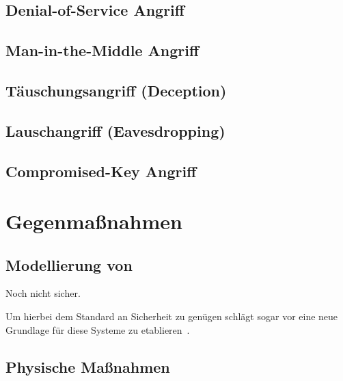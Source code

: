 \documentclass[final,bibliography=totocnumbered]{include/sikseminar}
\begin{document}
\subsection{Denial-of-Service Angriff}\label{subsec:dos}
\subsection{Man-in-the-Middle Angriff}\label{subsec:mitm}
\subsection{T\"auschungsangriff (Deception)}\label{subsec:tauschung} %
\subsection{Lauschangriff (Eavesdropping)}\label{subsec:lauschen} %
\subsection{Compromised-Key Angriff}\label{subsec:key}


\section{Gegenmaßnahmen}\label{sec:gegenmassnahmen}




\subsection{Modellierung von }\label{subsec:modellierung}
Noch nicht sicher.

Um hierbei dem Standard an Sicherheit zu genügen schlägt \citeauthor{Lee08} sogar vor eine neue Grundlage für diese Systeme zu etablieren~\cite{Lee08}.

\subsection{Physische Maßnahmen}\label{subsec:physisch}
\end{document}
